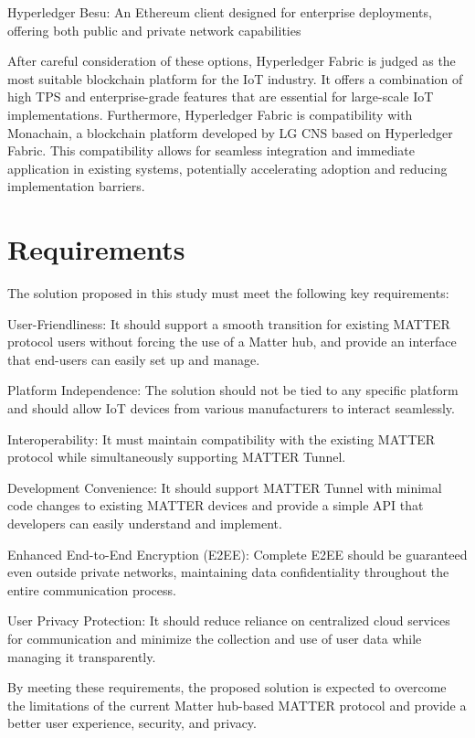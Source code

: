\documentclass[conference]{IEEEtran}
\begin{document}
\begin{enumerate}[itemsep=2ex, parsep=1ex]
    	Hyperledger  Besu: An Ethereum client designed for enterprise deployments, offering both public and private network capabilities
     
    After careful consideration of these options, Hyperledger Fabric is judged as the most suitable blockchain platform for the IoT industry. It offers a combination of high TPS and enterprise-grade features that are essential for large-scale IoT implementations.
    Furthermore, Hyperledger Fabric is compatibility with Monachain, a blockchain platform developed by LG CNS based on Hyperledger Fabric. This compatibility allows for seamless integration and immediate application in existing systems, potentially accelerating adoption and reducing implementation barriers.
    
\end{enumerate}

\section{Requirements}
The solution proposed in this study must meet the following key requirements:

User-Friendliness: It should support a smooth transition for existing MATTER protocol users without forcing the use of a Matter hub, and provide an interface that end-users can easily set up and manage.

Platform Independence: The solution should not be tied to any specific platform and should allow IoT devices from various manufacturers to interact seamlessly.

Interoperability: It must maintain compatibility with the existing MATTER protocol while simultaneously supporting MATTER Tunnel.

Development Convenience: It should support MATTER Tunnel with minimal code changes to existing MATTER devices and provide a simple API that developers can easily understand and implement.

Enhanced End-to-End Encryption (E2EE): Complete E2EE should be guaranteed even outside private networks, maintaining data confidentiality throughout the entire communication process.

User Privacy Protection: It should reduce reliance on centralized cloud services for communication and minimize the collection and use of user data while managing it transparently.

By meeting these requirements, the proposed solution is expected to overcome the limitations of the current Matter hub-based MATTER protocol and provide a better user experience, security, and privacy.
\end{document}

